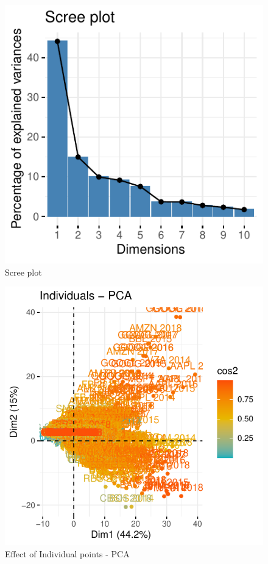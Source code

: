 \documentclass[11pt,]{article}
\begin{document}
\begin{figure}

{\centering \includegraphics{stock_analysis_files/figure-latex/scree-1} 

}

\caption{Scree plot}\label{fig:scree}
\end{figure}
\begin{figure}

{\centering \includegraphics{stock_analysis_files/figure-latex/PCAind-1} 

}

\caption{Effect of Individual points - PCA}\label{fig:PCAind}
\end{figure}
\end{document}
